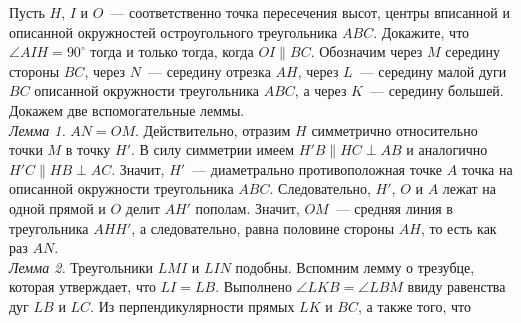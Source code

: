 \problem
Пусть $H$, $I$ и $O$~--- соответственно точка пересечения высот, центры
вписанной и описанной окружностей остроугольного треугольника $ABC$.
Докажите, что $\angle AIH = 90^\circ$ тогда и только тогда, когда
$OI \parallel BC$.
\solution
Обозначим через $M$ середину стороны $BC$, через $N$~--- середину отрезка $AH$,
через $L$~--- середину малой дуги $BC$ описанной окружности треугольника $ABC$,
а через $K$~--- середину большей.
Докажем две вспомогательные леммы.
\\
\emph{Лемма 1.} $AN = OM$.
Действительно, отразим $H$ симметрично относительно точки $M$ в точку $H'$.
В силу симметрии имеем $H'B \parallel HC \perp AB$ и аналогично
$H'C \parallel HB \perp AC$.
Значит, $H'$~--- диаметрально противоположная точке $A$ точка на описанной
окружности треугольника $ABC$.
Следовательно, $H'$, $O$ и $A$ лежат на одной прямой и $O$ делит $AH'$ пополам.
Значит, $OM$~--- средняя линия в треугольника $AHH'$, а следовательно, равна
половине стороны $AH$, то есть как раз $AN$.
\\
\emph{Лемма 2.} Треугольники $LMI$ и $LIN$ подобны.
Вспомним лемму о трезубце, которая утверждает, что $LI = LB$.
Выполнено $\angle LKB = \angle LBM$ ввиду равенства дуг $LB$ и $LC$.
Из перпендикулярности прямых $LK$ и $BC$, а также того, что
